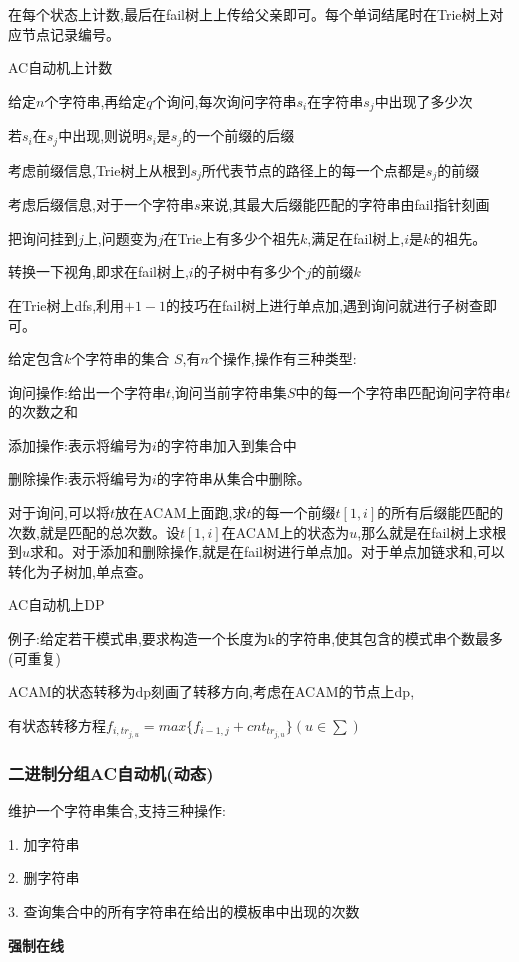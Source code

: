 \documentclass[a4paper]{ctexart}
\begin{document}
在每个状态上计数,最后在fail树上上传给父亲即可。每个单词结尾时在Trie树上对应节点记录编号。

AC自动机上计数

给定$n$个字符串,再给定$q$个询问,每次询问字符串$s_i$在字符串$s_j$中出现了多少次

若$s_i$在$s_j$中出现,则说明$s_i$是$s_j$的一个前缀的后缀

考虑前缀信息,Trie树上从根到$s_j$所代表节点的路径上的每一个点都是$s_j$的前缀

考虑后缀信息,对于一个字符串$s$来说,其最大后缀能匹配的字符串由fail指针刻画

把询问挂到$j$上,问题变为$j$在Trie上有多少个祖先$k$,满足在fail树上,$i$是$k$的祖先。

转换一下视角,即求在fail树上,$i$的子树中有多少个$j$的前缀$k$

在Trie树上dfs,利用$+1 -1$的技巧在fail树上进行单点加,遇到询问就进行子树查即可。

给定包含$k$个字符串的集合 $S$,有$n$个操作,操作有三种类型:

询问操作:给出一个字符串$t$,询问当前字符串集$S$中的每一个字符串匹配询问字符串$t$的次数之和

添加操作:表示将编号为$i$的字符串加入到集合中

删除操作:表示将编号为$i$的字符串从集合中删除。

对于询问,可以将$t$放在ACAM上面跑,求$t$的每一个前缀$t[1,i]$的所有后缀能匹配的次数,就是匹配的总次数。设$t[1,i]$在ACAM上的状态为$u$,那么就是在fail树上求根到$u$求和。对于添加和删除操作,就是在fail树进行单点加。对于单点加链求和,可以转化为子树加,单点查。

AC自动机上DP

例子:给定若干模式串,要求构造一个长度为k的字符串,使其包含的模式串个数最多(可重复)

ACAM的状态转移为dp刻画了转移方向,考虑在ACAM的节点上dp,

有状态转移方程$f_{i,tr_{j,u}}=max\{f_{i-1,j}+cnt_{tr_{j,u}}\}(u\in \sum)$ 

\subsubsection{二进制分组AC自动机(动态)}

维护一个字符串集合,支持三种操作:

1. 加字符串

2. 删字符串

3. 查询集合中的所有字符串在给出的模板串中出现的次数

\textbf{强制在线}
\end{document}
